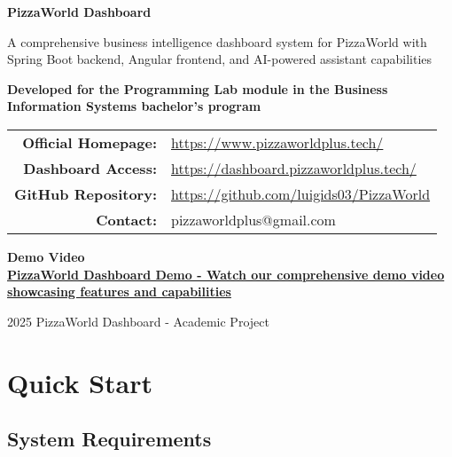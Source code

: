 \documentclass[11pt,a4paper]{article}
\begin{document}
\begin{titlepage}
    \centering
    \vspace*{2cm}
    
    {\Huge\bfseries PizzaWorld Dashboard}
    
    \vspace{1cm}
    
    {\Large A comprehensive business intelligence dashboard system for PizzaWorld with Spring Boot backend, Angular frontend, and AI-powered assistant capabilities}
    
    \vspace{2cm}
    
    {\large \textbf{Developed for the Programming Lab module in the Business Information Systems bachelor's program}}
    
    \vspace{3cm}
    
    \begin{tabular}{rl}
        \textbf{Official Homepage:} & \href{https://www.pizzaworldplus.tech/}{https://www.pizzaworldplus.tech/} \\[0.3cm]
        \textbf{Dashboard Access:} & \href{https://dashboard.pizzaworldplus.tech/}{https://dashboard.pizzaworldplus.tech/} \\[0.3cm]
        \textbf{GitHub Repository:} & \href{https://github.com/luigids03/PizzaWorld}{https://github.com/luigids03/PizzaWorld} \\[0.3cm]
        \textbf{Contact:} & pizzaworldplus@gmail.com
    \end{tabular}
    
    \vspace{2cm}
    
    {\large \textbf{Demo Video}}\\
    \href{https://www.youtube.com/watch?v=hr8LjElGZ5c}{\textbf{PizzaWorld Dashboard Demo - Watch our comprehensive demo video showcasing features and capabilities}}
    
    \vfill
    
    {\large \textcopyright{} 2025 PizzaWorld Dashboard - Academic Project}
\end{titlepage}

\tableofcontents
\newpage

\section{Quick Start}

\subsection{System Requirements}
\end{document}
